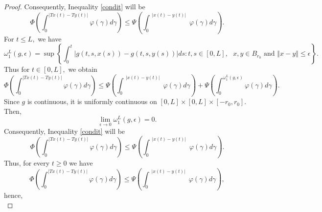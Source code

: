 \documentclass{amsart}
\theoremstyle{plain}
\numberwithin{equation}{section}
\begin{document}
\begin{proof}
Consequently, Inequality \ref{condit} will be\begin{equation*}
\Phi \left( \int_{0}^{\left\vert Tx\left( t\right) -Ty\left( t\right)
\right\vert }\varphi \left( \gamma \right) d\gamma \right) \leqslant \Psi
\left( \int_{0}^{\substack{ \left\vert x\left( t\right) -y\left( t\right)
\right\vert }}\varphi \left( \gamma \right) d\gamma \right) .
\end{equation*}For $t\leqslant L,$ we have\begin{equation*}
\omega _{1}^{L}\left( g,\epsilon \right) =\sup \left\{
\int_{0}^{t}\left\vert g\left( t,s,x\left( s\right) \right) -g\left(
t,s,y\left( s\right) \right) \right\vert ds:t,s\in \left[ 0,L\right] ,\text{ 
}x,y\in B_{r_{0}}\text{ and }\left\Vert x-y\right\Vert \leqslant \epsilon
\right\} \text{.}
\end{equation*}Thus for $t\in \left[ 0,L\right] ,$ we obtain\begin{equation*}
\Phi \left( \int_{0}^{\left\vert Tx\left( t\right) -Ty\left( t\right)
\right\vert }\varphi \left( \gamma \right) d\gamma \right) \leqslant \Psi
\left( \int_{0}^{\substack{ \left\vert x\left( t\right) -y\left( t\right)
\right\vert }}\varphi \left( \gamma \right) d\gamma \right) +\Psi \left(
\int_{0}^{\omega _{1}^{L}\left( g,\epsilon \right) }\varphi \left( \gamma
\right) d\gamma \right) .
\end{equation*}Since $g$ is continuous, it is uniformly continuous on $\left[ 0,L\right]
\times \left[ 0,L\right] \times \left[ -r_{0},r_{0}\right] $. Then,\begin{equation*}
\lim_{\epsilon \rightarrow 0}\omega _{1}^{L}\left( g,\epsilon \right) =0.
\end{equation*}Consequently, Inequality \ref{condit} will be\begin{equation*}
\Phi \left( \int_{0}^{\left\vert Tx\left( t\right) -Ty\left( t\right)
\right\vert }\varphi \left( \gamma \right) d\gamma \right) \leqslant \Psi
\left( \int_{0}^{\substack{ \left\vert x\left( t\right) -y\left( t\right)
\right\vert }}\varphi \left( \gamma \right) d\gamma \right) .
\end{equation*}Thus, for every $t\geqslant 0$ we have\begin{equation*}
\Phi \left( \int_{0}^{\left\vert Tx\left( t\right) -Ty\left( t\right)
\right\vert }\varphi \left( \gamma \right) d\gamma \right) \leqslant \Psi
\left( \int_{0}^{\substack{ \left\vert x\left( t\right) -y\left( t\right)
\right\vert }}\varphi \left( \gamma \right) d\gamma \right) ,
\end{equation*}hence,\begin{equation*}

\end{equation*}
\end{proof}
\end{document}
